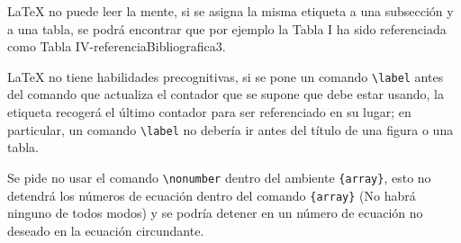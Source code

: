 \documentclass[letterpaper, 10pt, conference]{IEEEtran} %
\begin{document}
	{\LaTeX} no puede leer la mente, si se asigna la misma etiqueta a una subsección y a una tabla, se podrá encontrar que por ejemplo la Tabla I ha sido referenciada como Tabla IV-referenciaBibliografica3.
	
	{\LaTeX} no tiene habilidades precognitivas, si se pone un comando \verb|\label| antes del comando que actualiza el contador que se supone que debe estar usando, la etiqueta recogerá el último contador para ser referenciado en su lugar; en particular, un comando \verb|\label| no debería ir antes del título de una figura o una tabla.
	
	Se pide no usar el comando \verb|\nonumber| dentro del ambiente \verb|{array}|, esto no detendrá los números de ecuación dentro del comando \verb|{array}| (No habrá ninguno de todos modos) y se podría detener en un número de ecuación no deseado en la ecuación circundante.
	
\end{document}
